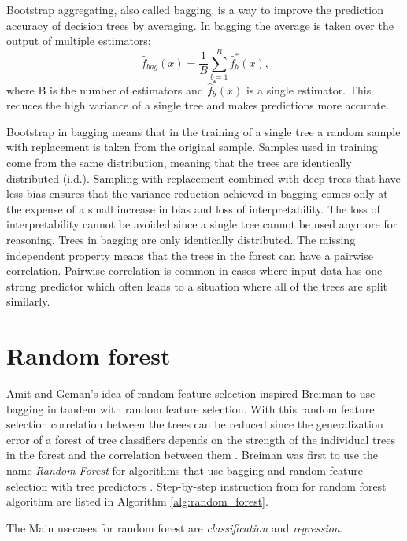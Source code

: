 Bootstrap aggregating, also called bagging, is a way to improve the prediction accuracy of decision trees by averaging. In bagging the average is taken over the output of multiple estimators:
\begin{equation}
    \hat {f}_{bag}(x) = \frac{1}{B}\sum_{b = 1}^{B} \hat {f}^{*}_{b}(x) \text{,}
\end{equation}
where B is the number of estimators and $\hat {f}^{*}_{b}(x)$ is a single estimator. This reduces the high variance of a single tree and makes predictions more accurate.

Bootstrap in bagging means that in the training of a single tree a random sample with replacement is taken from the original sample. Samples used in training come from the same distribution, meaning that the trees are identically distributed (i.d.). Sampling with replacement combined with deep trees that have less bias ensures that the variance reduction achieved in bagging comes only at the expense of a small increase in bias and loss of interpretability. The loss of interpretability cannot be avoided since a single tree cannot be used anymore for reasoning. Trees in bagging are only identically distributed. The missing independent property means that the trees in the forest can have a pairwise correlation. Pairwise correlation is common in cases where input data has one strong predictor which often leads to a situation where all of the trees are split similarly. \cite{friedman2001elements}

\section{Random forest}
Amit and Geman's \cite{amit1997shape} idea of random feature selection inspired Breiman to use bagging in tandem with random feature selection. With this random feature selection correlation between the trees can be reduced since the generalization error of a forest of tree classifiers depends on the strength of the individual trees in the forest and the correlation between them \cite{breiman2001random}. Breiman was first to use the name \textit{Random Forest} for algorithms that use bagging and random feature selection with tree predictors \cite{breiman2001random}. Step-by-step instruction from \cite{friedman2001elements} for random forest algorithm are listed in Algorithm \ref{alg:random_forest}.

The Main usecases for random forest are \textit{classification} and \textit{regression}.

